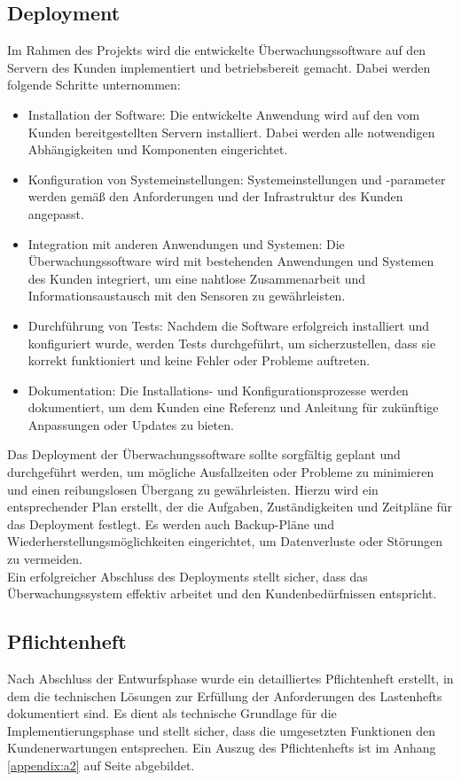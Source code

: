 \begin{flushleft}
		\subsection{Deployment} Im Rahmen des Projekts wird die entwickelte Überwachungssoftware auf den Servern des Kunden implementiert und betriebsbereit gemacht. Dabei werden folgende Schritte unternommen:

			\begin{itemize}
				\item Installation der Software: Die entwickelte Anwendung wird auf den vom Kunden bereitgestellten Servern installiert. Dabei werden alle notwendigen Abhängigkeiten und Komponenten eingerichtet.
				\item Konfiguration von Systemeinstellungen: Systemeinstellungen und -parameter werden gemäß den Anforderungen und der Infrastruktur des Kunden angepasst.
				\item Integration mit anderen Anwendungen und Systemen: Die Überwachungssoftware wird mit bestehenden Anwendungen und Systemen des Kunden integriert, um eine nahtlose Zusammenarbeit und Informationsaustausch mit den Sensoren zu gewährleisten.
				\item Durchführung von Tests: Nachdem die Software erfolgreich installiert und konfiguriert wurde, werden Tests durchgeführt, um sicherzustellen, dass sie korrekt funktioniert und keine Fehler oder Probleme auftreten.
				\item Dokumentation: Die Installations- und Konfigurationsprozesse werden dokumentiert, um dem Kunden eine Referenz und Anleitung für zukünftige Anpassungen oder Updates zu bieten.
			\end{itemize}

			Das Deployment der Überwachungssoftware sollte sorgfältig geplant und durchgeführt werden, um mögliche Ausfallzeiten oder Probleme zu minimieren und einen reibungslosen Übergang zu gewährleisten. Hierzu wird ein entsprechender Plan erstellt, der die Aufgaben, Zuständigkeiten und Zeitpläne für das Deployment festlegt. Es werden auch Backup-Pläne und Wiederherstellungsmöglichkeiten eingerichtet, um Datenverluste oder Störungen zu vermeiden.
			\\
			Ein erfolgreicher Abschluss des Deployments stellt sicher, dass das Überwachungssystem effektiv arbeitet und den Kundenbedürfnissen entspricht.


		\subsection{Pflichtenheft}
			Nach Abschluss der Entwurfsphase wurde ein detailliertes Pflichtenheft erstellt, in dem die technischen Lösungen zur Erfüllung der Anforderungen des Lastenhefts dokumentiert sind. Es dient als technische Grundlage für die Implementierungsphase und stellt sicher, dass die umgesetzten Funktionen den Kundenerwartungen entsprechen. Ein Auszug des Pflichtenhefts ist im Anhang \ref{appendix:a2} auf Seite \pageref{appendix:a2} abgebildet.



\end{flushleft}
